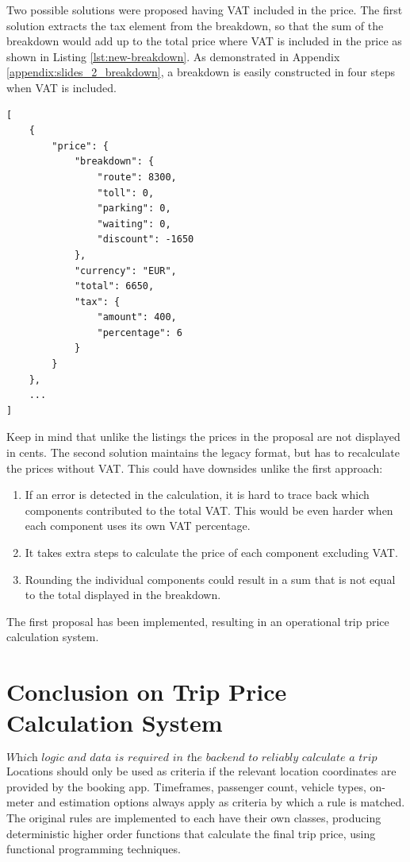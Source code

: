 Two possible solutions were proposed having VAT included in the price. The first solution extracts the tax element from the breakdown, so that the sum of the breakdown would add up to the total price where VAT is included in the price as shown in Listing \ref{lst:new-breakdown}. As demonstrated in Appendix \ref{appendix:slides_2_breakdown}, a breakdown is easily constructed in four steps when VAT is included.

\begin{center}
\noindent\begin{minipage}{.85\textwidth}
\begin{lstlisting}[caption={Improved price breakdown}, label={lst:new-breakdown}]
[
	{
		"price": {
			"breakdown": {
				"route": 8300,
				"toll": 0,
				"parking": 0,
				"waiting": 0,
				"discount": -1650
			},
			"currency": "EUR",
			"total": 6650,
			"tax": {
				"amount": 400,
				"percentage": 6
			}
		}
	},
	...
]
\end{lstlisting}
\end{minipage}
\end{center}

Keep in mind that unlike the listings the prices in the proposal are not displayed in cents. The second solution maintains the legacy format, but has to recalculate the prices without VAT. This could have downsides unlike the first approach:

\begin{enumerate}
	\item If an error is detected in the calculation, it is hard to trace back which components contributed to the total VAT. This would be even harder when each component uses its own VAT percentage.
	\item It takes extra steps to calculate the price of each component excluding VAT.
	\item Rounding the individual components could result in a sum that is not equal to the total displayed in the breakdown.
\end{enumerate}

The first proposal has been implemented, resulting in an operational trip price calculation system.

\section{Conclusion on Trip Price Calculation System}
\[\textit{Which logic and data is required in the backend to reliably calculate a trip price?}\]\hfill
Locations should only be used as criteria if the relevant location coordinates are provided by the booking app. Timeframes, passenger count, vehicle types, on-meter and estimation options always apply as criteria by which a rule is matched. The original rules are implemented to each have their own classes, producing deterministic higher order functions that calculate the final trip price, using functional programming techniques.
